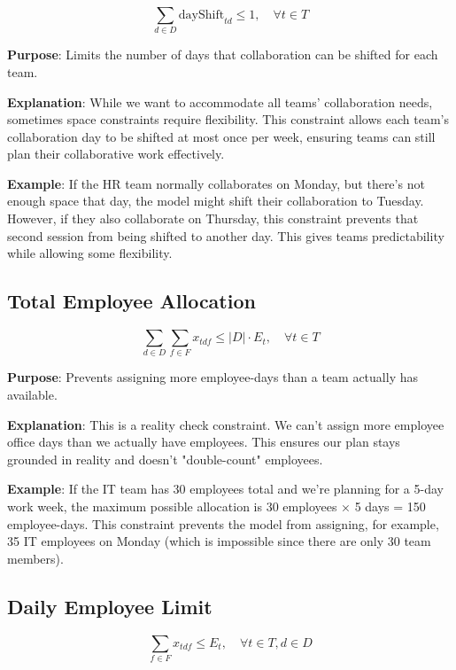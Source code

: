 \documentclass[12pt,a4paper]{article}
\begin{document}
\begin{equation}
\sum_{d\in D} \text{dayShift}_{td} \leq 1, \quad \forall t \in T
\end{equation}

\textbf{Purpose}: Limits the number of days that collaboration can be shifted for each team.

\textbf{Explanation}: While we want to accommodate all teams' collaboration needs, sometimes space constraints require flexibility. This constraint allows each team's collaboration day to be shifted at most once per week, ensuring teams can still plan their collaborative work effectively.

\textbf{Example}: If the HR team normally collaborates on Monday, but there's not enough space that day, the model might shift their collaboration to Tuesday. However, if they also collaborate on Thursday, this constraint prevents that second session from being shifted to another day. This gives teams predictability while allowing some flexibility.

\subsection{Total Employee Allocation}

\begin{equation}
\sum_{d\in D} \sum_{f\in F} x_{tdf} \leq |D| \cdot E_t, \quad \forall t \in T
\end{equation}

\textbf{Purpose}: Prevents assigning more employee-days than a team actually has available.

\textbf{Explanation}: This is a reality check constraint. We can't assign more employee office days than we actually have employees. This ensures our plan stays grounded in reality and doesn't "double-count" employees.

\textbf{Example}: If the IT team has 30 employees total and we're planning for a 5-day work week, the maximum possible allocation is 30 employees × 5 days = 150 employee-days. This constraint prevents the model from assigning, for example, 35 IT employees on Monday (which is impossible since there are only 30 team members).

\subsection{Daily Employee Limit}

\begin{equation}
\sum_{f\in F} x_{tdf} \leq E_t, \quad \forall t \in T, d \in D
\end{equation}
\end{document}
